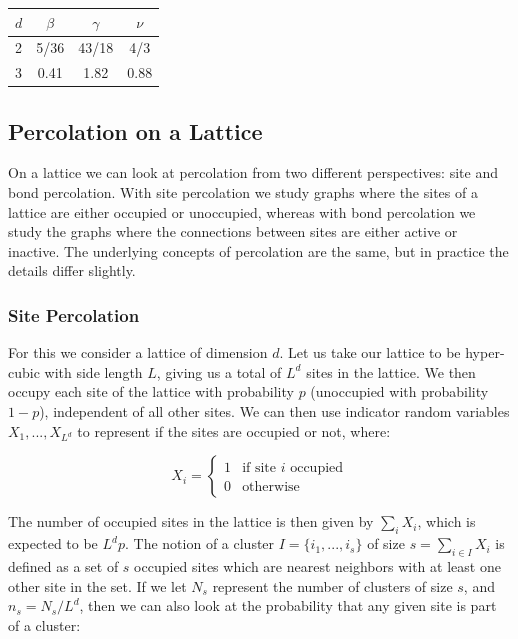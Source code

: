 \begin{center}
  \begin{tabular}{ | l | c | c | c | }
    \hline
    $d$ & $\beta$ & $\gamma$ & $\nu$ \\ \hline
    2 & 5/36 & 43/18 & 4/3 \\ \hline
    3 & 0.41 & 1.82 & 0.88 \\
    \hline
  \end{tabular}
\end{center}



\subsection{Percolation on a Lattice}
On a lattice we can look at percolation from two different perspectives: site and bond percolation.
With site percolation we study graphs where the sites of a lattice are either occupied or unoccupied, whereas with bond percolation we study the graphs where the connections between sites are either active or inactive.
The underlying concepts of percolation are the same, but in practice the details differ slightly.



\subsubsection{Site Percolation}
For this we consider a lattice of dimension $d$.
Let us take our lattice to be hyper-cubic with side length $L$, giving us a total of $L^d$ sites in the lattice.
We then occupy each site of the lattice with probability $p$ (unoccupied with probability $1 - p$), independent of all other sites.
We can then use indicator random variables $X_1, ..., X_{L^d}$ to represent if the sites are occupied or not, where:

\[
X_i =
\begin{cases}
	1 & \text{if site } i \text{ occupied} \\
	0 & \text{otherwise}
\end{cases}
\]

The number of occupied sites in the lattice is then given by $\sum_i X_i$, which is expected to be $L^d p$.
The notion of a cluster $I = \{i_1, ..., i_s\}$ of size $s = \sum_{i \in I} X_i$ is defined as a set of $s$ occupied sites which are nearest neighbors with at least one other site in the set.
If we let $N_s$ represent the number of clusters of size $s$, and $n_s = N_s / L^d$, then we can also look at the probability that any given site is part of a cluster:

